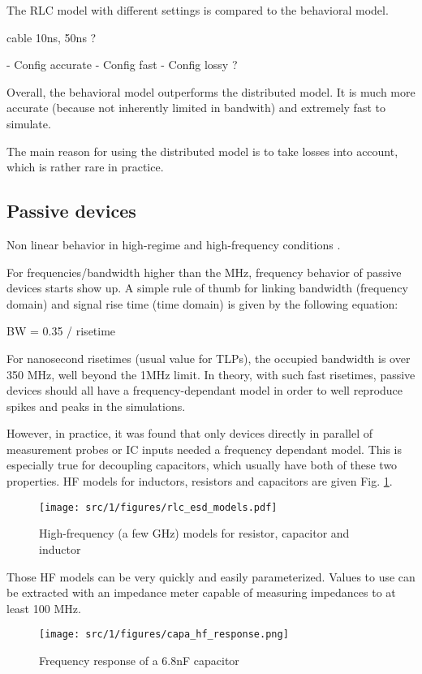 The RLC model with different settings is compared to the behavioral model.

cable 10ns, 50ns ?

- Config accurate
- Config fast
- Config lossy ?

Overall, the behavioral model outperforms the distributed model.
It is much more accurate (because not inherently limited in bandwith) and extremely fast to simulate.

The main reason for using the distributed model is to take losses into account, which is rather rare in practice.

\subsection{Passive devices}

Non linear behavior in high-regime and high-frequency conditions \cite{capa-esd-cz}.

For frequencies/bandwidth higher than the MHz, frequency behavior of  passive devices starts show up.
A simple rule of thumb for linking bandwidth (frequency domain) and signal rise time (time domain) is given by the following equation:

BW = 0.35 / risetime

For nanosecond risetimes (usual value for TLPs), the occupied bandwidth is over 350 MHz, well beyond the 1MHz limit.
In theory, with such fast risetimes, passive devices should all have a frequency-dependant model in order to well reproduce spikes and peaks in the simulations.

However, in practice, it was found that only devices directly in parallel of measurement probes or IC inputs needed a frequency dependant model.
This is especially true for decoupling capacitors, which usually have both of these two properties.
HF models for inductors, resistors and capacitors are given Fig. \ref{fig:rlc-esd-models}.

\begin{figure}[!h]
  \centering
  \texttt{[image: src/1/figures/rlc\_esd\_models.pdf]}
  \caption{High-frequency (a few GHz) models for resistor, capacitor and inductor}
  \label{fig:rlc-esd-models}
\end{figure}

Those HF models can be very quickly and easily parameterized.
Values to use can be extracted with an impedance meter capable of measuring impedances to at least 100 MHz.

\begin{figure}[!h]
  \centering
  \texttt{[image: src/1/figures/capa\_hf\_response.png]}
  \caption{Frequency response of a 6.8nF capacitor}
  \label{fig:frequency-response-capa}
\end{figure}

